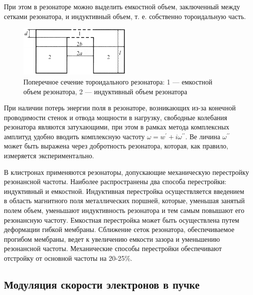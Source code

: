 При этом в резонаторе можно выделить емкостной объем, заключенный между сетками резонатора, и индуктивный объем, т. е. собственно тороидальную часть.

\begin{figure}[H]
	\centering
	\includegraphics[width=0.5\textwidth]{fig/fig2}
	\caption{Поперечное сечение тороидального резонатора: 1 — емкостной объем резонатора, 2 — индуктивный объем резонатора}
	\label{fig:2}
\end{figure}

При наличии потерь энергии поля в резонаторе, возникающих из-за конечной проводимости стенок и отвода мощности в нагрузку, свободные колебания резонатора являются затухающими, при этом в рамках метода комплексных амплитуд удобно вводить комплексную частоту $\omega = w^{\prime}+i\omega ^{\prime \prime}$. Ве­
личина $\omega ^{ \prime \prime }$ может быть выражена через добротность резонатора, которая, как правило, измеряется экспериментально.

В клистронах применяются резонаторы, допускающие механическую перестройку резонансной частоты. Наиболее распространены два способа перестройки: индуктивный и емкостной. Индуктивная перестройка осуществляется введением в область магнитного поля металлических поршней, кото­рые, уменьшая занятый полем объем, уменьшают индуктивность резонатора и тем самым повышают его резонансную частоту. Емкостная перестройка может быть осуществлена путем деформации гибкой мембраны. Сближение сеток резонатора, обеспечиваемое прогибом мембраны, ведет к увеличению емкости зазора и уменьшению резонансной частоты. Механические способы перестройки обеспечивают отстройку от основной частоты на 20-25\%.

\subsection{Модуляция скорости электронов в пучке}

